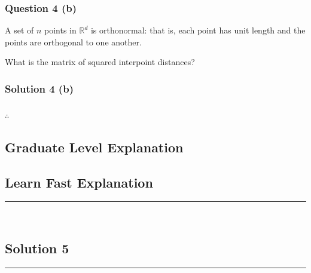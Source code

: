 \documentclass{article}
\begin{document}
\subsubsection*{Question 4 (b)}
\begin{flushleft}
    A set of $n$ points in $\mathbb{R}^d$ is orthonormal: that is, each point has unit length and the points are orthogonal to one another.

\end{flushleft}
\begin{flushleft}

What is the matrix of squared interpoint distances?
  
\end{flushleft}

\subsubsection*{Solution 4 (b)}


\subsubsection*{\normalfont}{$\therefore$ }

\subsection*{Graduate Level Explanation}

\subsection*{Learn Fast Explanation}

\noindent\rule{\textwidth}{0.4pt}\\

\newpage

\subsection*{Solution 5}
\noindent\rule{\textwidth}{0.4pt}\\
\end{document}
